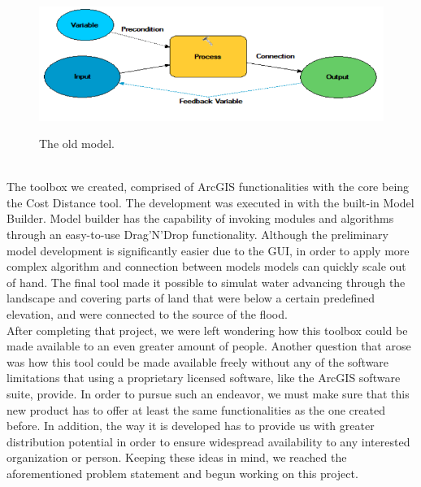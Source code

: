 \begin{figure}[h!]
\centering
	{\includegraphics[width=\linewidth]{gfx/Methodology/old_project.png}}
\caption{The old model.}
\label{fig:inputs}
\end{figure}\\

The toolbox we created, comprised of ArcGIS functionalities with the core being the Cost Distance tool. The development was executed in with the built-in Model Builder. Model builder has the capability of invoking modules and algorithms through an easy-to-use Drag'N'Drop functionality. Although the preliminary model development is significantly easier due to the GUI, in order to apply more complex algorithm and connection between models models can quickly scale out of hand. 
The final tool made it possible to simulat water advancing through the landscape and covering parts of land that were below a certain predefined elevation, and were connected to the source of the flood. \\

After completing that project, we were left wondering how this toolbox could be made available to an even greater amount of people. Another question that arose was how this tool could be made available freely without any of the software limitations that using a proprietary licensed software, like the ArcGIS software suite, provide.
In order to pursue such an endeavor, we must make sure that this new product has to offer at least the same functionalities as the one created before. In addition, the way it is developed has to provide us with greater distribution potential in order to ensure widespread availability to any interested organization or person. Keeping these ideas in mind, we reached the aforementioned problem statement and begun working on this project.

